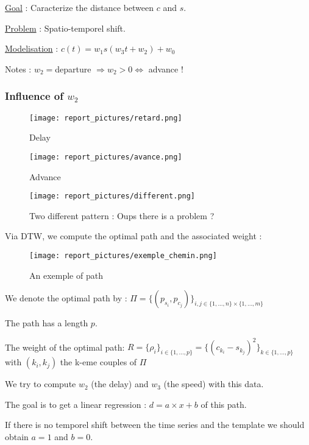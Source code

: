 \documentclass[a4,12pt]{article}
\begin{document}
	\underline{Goal} : Caracterize the distance between $c$ and $s$.
	
	\underline{Problem} : Spatio-temporel shift.
	
	\underline{Modelisation} : $c(t) = w_1 s(w_3 t + w_2) + w_0$
	
	Notes : $w_2=$departure $ \Rightarrow w_2 > 0 \Leftrightarrow $ advance !
	
	\subsubsection{Influence of $w_2$}
	
	\begin{figure}[H]
		\centering
		\texttt{[image: report\_pictures/retard.png]}
		\caption{Delay}
		\label{retard}
	\end{figure}
	
	\begin{figure}[H]
		\centering
		\texttt{[image: report\_pictures/avance.png]}
		\caption{Advance}
		\label{avance}
	\end{figure}
	
	\begin{figure}[H]
		\centering
		\texttt{[image: report\_pictures/different.png]}
		\caption{Two different pattern : Oups there is a problem ?}
		\label{different}
	\end{figure}
	
	Via DTW, we compute the optimal path and the associated weight :
	
	\begin{figure}[H]
		\centering
		\texttt{[image: report\_pictures/exemple\_chemin.png]}
		\caption{An exemple of path}
		\label{ex_dist_rep}
	\end{figure}
	
	We denote the optimal path by : $\Pi = \{(p_{s_i}, p_{c_j})\}_{i,j \in \{1, ..., n\} \times \{1, ..., m\} }$
	
	The path has a length $p$.
	
	The weight of the optimal path: $R = \{ \rho_i \}_{i \in \{1, ..., p\} } = \{ (c_{k_i} - s_{k_j})^2 \}_{k \in \{1, ..., p\} }$ with $(k_i,k_j)$ the k-eme couples of $\Pi$
	
	We try to compute $w_2$ (the delay) and $w_3$ (the speed) with this data.
	
	The goal is to get a linear regression : $d = a \times x + b$ of this path. 
	
	If there is no temporel shift between the time series and the template we should obtain $a=1$ and $b=0$.
	
\end{document}
